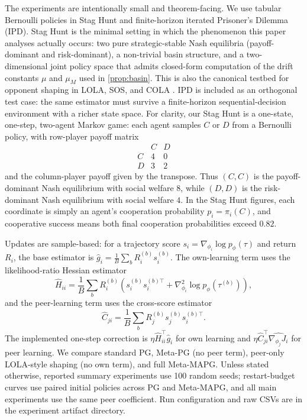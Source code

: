 \documentclass{article}
\theoremstyle{plain}
\theoremstyle{definition}
\theoremstyle{remark}
\begin{document}
The experiments are intentionally small and theorem-facing. We use tabular Bernoulli policies in Stag Hunt and finite-horizon iterated Prisoner's Dilemma (IPD). Stag Hunt is the minimal setting in which the phenomenon this paper analyses actually occurs: two pure strategic-stable Nash equilibria (payoff-dominant and risk-dominant), a non-trivial basin structure, and a two-dimensional joint policy space that admits closed-form computation of the drift constants $\mu$ and $\mu_M$ used in \cref{prop:basin}. This is also the canonical testbed for opponent shaping in LOLA, SOS, and COLA \citep{foerster2018lola,letcher2019stable,willi2022cola}. IPD is included as an orthogonal test case: the same estimator must survive a finite-horizon sequential-decision environment with a richer state space. For clarity, our Stag Hunt is a one-state, one-step, two-agent Markov game: each agent samples $C$ or $D$ from a Bernoulli policy, with row-player payoff matrix
\[
\begin{array}{c|cc}
 & C & D\\ \hline
C & 4 & 0\\
D & 3 & 2
\end{array}
\]
and the column-player payoff given by the transpose. Thus $(C,C)$ is the payoff-dominant Nash equilibrium with social welfare $8$, while $(D,D)$ is the risk-dominant Nash equilibrium with social welfare $4$. In the Stag Hunt figures, each coordinate is simply an agent's cooperation probability $p_i=\pi_i(C)$, and cooperative success means both final cooperation probabilities exceed $0.82$.

Updates are sample-based: for a trajectory score $s_i=\nabla_{\phi_i}\log p_\phi(\tau)$ and return $R_i$, the base estimator is $\hat g_i=\frac{1}{B}\sum_b R_i^{(b)}s_i^{(b)}$. The own-learning term uses the likelihood-ratio Hessian estimator
\[
\widehat H_{ii}=\frac{1}{B}\sum_b R_i^{(b)}\left(s_i^{(b)}s_i^{(b)\top}+\nabla_{\phi_i}^2\log p_\phi(\tau^{(b)})\right),
\]
and the peer-learning term uses the cross-score estimator
\[
\widehat C_{ji}=\frac{1}{B}\sum_b R_j^{(b)}s_j^{(b)}s_i^{(b)\top}.
\]
The implemented one-step correction is $\eta\widehat H_{ii}^\top\hat g_i$ for own learning and $\eta\widehat C_{ji}^\top\widehat{\nabla_{\phi_j}J_i}$ for peer learning. We compare standard PG, Meta-PG (no peer term), peer-only LOLA-style shaping (no own term), and full Meta-MAPG. Unless stated otherwise, reported summary experiments use 100 random seeds; restart-budget curves use paired initial policies across PG and Meta-MAPG, and all main experiments use the same peer coefficient. Run configuration and raw CSVs are in the experiment artifact directory.
\end{document}
